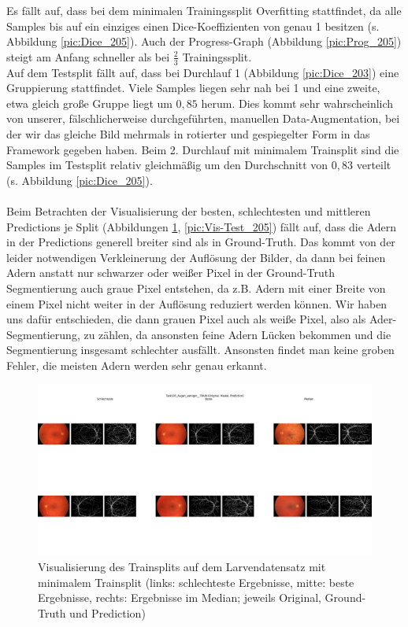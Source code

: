 Es fällt auf, dass bei dem minimalen Trainingssplit Overfitting stattfindet, da alle Samples bis auf ein einziges einen Dice-Koeffizienten von genau 1 besitzen (s. Abbildung \ref{pic:Dice_205}). Auch der Progress-Graph (Abbildung \ref{pic:Prog_205}) steigt am Anfang schneller als bei $\frac{2}{3}$ Trainingssplit.\\
Auf dem Testsplit fällt auf, dass bei Durchlauf 1 (Abbildung \ref{pic:Dice_203}) eine Gruppierung stattfindet. Viele Samples liegen sehr nah bei 1 und eine zweite, etwa gleich große Gruppe liegt um $0,85$ herum. Dies kommt sehr wahrscheinlich von unserer, fälschlicherweise durchgeführten, manuellen Data-Augmentation, bei der wir das gleiche Bild mehrmals in rotierter und gespiegelter Form in das Framework gegeben haben. Beim 2. Durchlauf mit minimalem Trainsplit sind die Samples im Testsplit relativ gleichmäßig um den Durchschnitt von $0,83$ verteilt (s. Abbildung \ref{pic:Dice_205}).\\\\
Beim Betrachten der Visualisierung der besten, schlechtesten und mittleren Predictions je Split (Abbildungen \ref{pic:Vis-Train_205}, \ref{pic:Vis-Test_205}) fällt auf, dass die Adern in der Predictions generell breiter sind als in Ground-Truth. Das kommt von der leider notwendigen Verkleinerung der Auflösung der Bilder, da dann bei feinen Adern anstatt nur schwarzer oder weißer Pixel in der Ground-Truth Segmentierung auch graue Pixel entstehen, da z.B. Adern mit einer Breite von einem Pixel nicht weiter in der Auflösung reduziert werden können. Wir haben uns dafür entschieden, die dann grauen Pixel auch als weiße Pixel, also als Ader-Segmentierung, zu zählen, da ansonsten feine Adern Lücken bekommen und die Segmentierung insgesamt schlechter ausfällt. Ansonsten findet man keine groben Fehler, die meisten Adern werden sehr genau erkannt.



\begin{figure}[H]
\centering
\includegraphics[height=0.35\textheight, width=\textwidth]{Pictures/nnUnet/Praxis/Task205-Augen-minimal-13-trainsamples/Vis-Train.png}
\caption{Visualisierung des Trainsplits auf dem Larvendatensatz mit minimalem Trainsplit (links: schlechteste Ergebnisse, mitte: beste Ergebnisse, rechts: Ergebnisse im Median; jeweils Original, Ground-Truth und Prediction)}
\label{pic:Vis-Train_205}
\end{figure}


